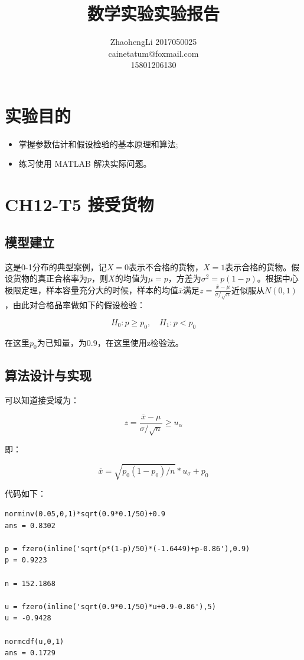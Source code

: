 \documentclass{article}
\title{数学实验实验报告}
\author{ZhaohengLi 2017050025\\cainetatum@foxmail.com\\15801206130}
\begin{document}
\maketitle
\section{实验目的}
\begin{itemize}
	\item{掌握参数估计和假设检验的基本原理和算法;}
	\item{练习使用 MATLAB 解决实际问题。}
\end{itemize}


\section{CH12-T5 接受货物}

\subsection{模型建立}

这是0-1分布的典型案例，记$X=0$表示不合格的货物，$X=1$表示合格的货物。假设货物的真正合格率为$p$，则$X$的均值为$\mu=p$，方差为$\sigma^2=p(1-p)$。根据中心极限定理，样本容量充分大的时候，样本的均值$\overline x$满足$z=\frac{\overline x-\mu}{\sigma / \sqrt n}$近似服从$N(0,1)$，由此对合格品率做如下的假设检验：

$$H_0:p\geq p_0,\quad H_1:p<p_0$$

在这里$p_0$为已知量，为0.9，在这里使用z检验法。


\subsection{算法设计与实现}

可以知道接受域为：

$$z=\frac{\overline x-\mu}{\sigma / \sqrt n}\geq u_\alpha$$

即：

$$\overline x=\sqrt{p_0(1-p_0)/n}*u_\sigma+p_0$$

代码如下：

\begin{lstlisting}
norminv(0.05,0,1)*sqrt(0.9*0.1/50)+0.9
ans = 0.8302

p = fzero(inline('sqrt(p*(1-p)/50)*(-1.6449)+p-0.86'),0.9)
p = 0.9223

n = 152.1868

u = fzero(inline('sqrt(0.9*0.1/50)*u+0.9-0.86'),5)
u = -0.9428

normcdf(u,0,1)
ans = 0.1729

\end{lstlisting}
\end{document}
